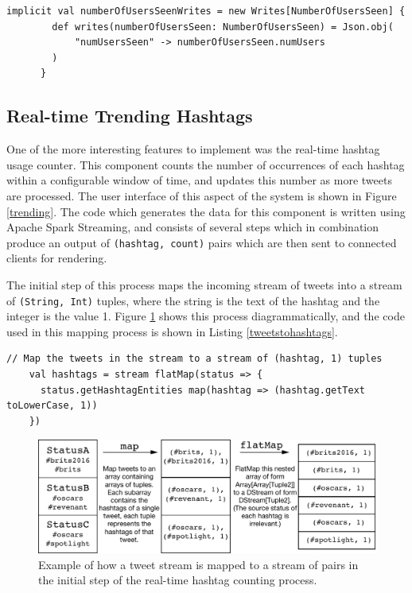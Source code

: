 \documentclass{l4proj}
\newcommand{\code}[1]{\texttt{#1}}
\begin{document}
    \begin{lstlisting}[caption=Code for conversion of the NumberOfUsersSeen Scala case class to JSON format.,label=writesconverter]
      implicit val numberOfUsersSeenWrites = new Writes[NumberOfUsersSeen] {
        def writes(numberOfUsersSeen: NumberOfUsersSeen) = Json.obj(
            "numUsersSeen" -> numberOfUsersSeen.numUsers
        )
      }
    \end{lstlisting}

\subsection{Real-time Trending Hashtags}

One of the more interesting features to implement was the real-time hashtag usage counter. This component counts the number of occurrences of each hashtag within a configurable window of time, and updates this number as more tweets are processed. The user interface of this aspect of the system is shown in Figure \ref{trending}. The code which generates the data for this component is written using Apache Spark Streaming, and consists of several steps which in combination produce an output of \code{(hashtag, count)} pairs which are then sent to connected clients for rendering.

The initial step of this process maps the incoming stream of tweets into a stream of \code{(String, Int)} tuples, where the string is the text of the hashtag and the integer is the value 1. Figure \ref{mappingstep} shows this process diagrammatically, and the code used in this mapping process is shown in Listing \ref{tweetstohashtags}.

\begin{lstlisting}[caption=Initial mapping of tweets to hashtags pairs.,label=tweetstohashtags]
    // Map the tweets in the stream to a stream of (hashtag, 1) tuples
    val hashtags = stream flatMap(status => {
      status.getHashtagEntities map(hashtag => (hashtag.getText toLowerCase, 1))
    })
\end{lstlisting}

\begin{figure}
\centering
\includegraphics[scale=0.75]{mappingstep.pdf}
\caption{Example of how a tweet stream is mapped to a stream of pairs in the initial step of the real-time hashtag counting process.}
\label{mappingstep}
\end{figure}
               
\end{document}
